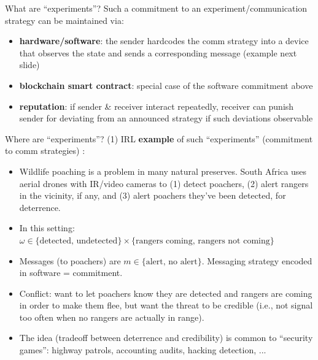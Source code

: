 \documentclass[english,10pt
,aspectratio=169
]{beamer}
\begin{document}
\begin{frame}{What are ``experiments''?}
	Such a commitment to an experiment/communication strategy can be maintained via:
	\begin{itemize}
		\item \textbf{hardware/software}: the sender hardcodes the comm strategy into a device that observes the state and sends a corresponding message (example next slide)
		
		\item \textbf{blockchain smart contract}: special case of the software commitment above
		
		\item \textbf{reputation}: if sender \& receiver interact repeatedly, receiver can punish sender for deviating from an announced strategy if such deviations observable \citep{best_persuasion_2020}
	\end{itemize}
\end{frame}


\begin{frame}{Where  are ``experiments''? (1)}
	IRL \textbf{example} of such ``experiments'' (commitment to comm strategies) \citep{bondi_signal_2020}:
	\begin{itemize}
		\item \alert{Wildlife poaching} is a problem in many natural preserves. South Africa uses aerial drones with IR/video cameras to (1) detect poachers, (2) alert rangers in the vicinity, if any, and (3) alert poachers they've been detected, for deterrence.
		
		\item In this setting: $\omega \in \{ \text{detected, undetected} \} \times \{ \text{rangers coming, rangers not coming} \}$
		
		\item Messages (to poachers) are $m \in \{ \text{alert, no alert} \}$. Messaging strategy encoded in software = commitment.
		
		\item Conflict: want to let poachers know they are detected and rangers are coming in order to make them flee, but want the threat to be credible (i.e., not signal too often when no rangers are actually in range).
		
		\item The idea (tradeoff between deterrence and credibility) is common to ``\alert{security games}'': highway patrols, accounting audits, hacking detection, ...
	\end{itemize}
\end{frame}
\end{document}
